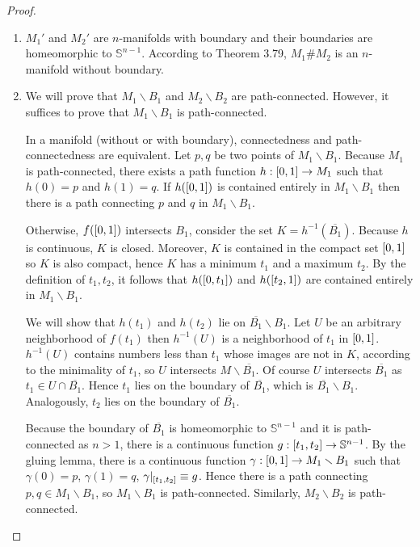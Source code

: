 \begin{proof}
	\begin{enumerate}[label={(\alph*)}]
		\item $M_{1}'$ and $M_{2}'$ are $n$-manifolds with boundary and their boundaries are homeomorphic to $\mathbb{S}^{n-1}$. According to Theorem 3.79, $M_{1} \# M_{2}$ is an $n$-manifold without boundary.
		\item We will prove that $M_{1}\smallsetminus B_{1}$ and $M_{2}\smallsetminus B_{2}$ are path-connected. However, it suffices to prove that $M_{1}\smallsetminus B_{1}$ is path-connected.

		      In a manifold (without or with boundary), connectedness and path-connectedness are equivalent. Let $p, q$ be two points of $M_{1}\smallsetminus B_{1}$. Because $M_{1}$ is path-connected, there exists a path function $h: \left[{0, 1}\right] \to M_{1}$ such that $h(0) = p$ and $h(1) = q$. If $h(\left[{0, 1}\right])$ is contained entirely in $M_{1}\smallsetminus B_{1}$ then there is a path connecting $p$ and $q$ in $M_{1}\smallsetminus B_{1}$.

		      Otherwise, $f(\left[{0, 1}\right])$ intersects $B_{1}$, consider the set $K = h^{-1}(\overline{B_{1}})$. Because $h$ is continuous, $K$ is closed. Moreover, $K$ is contained in the compact set $\left[{0, 1}\right]$ so $K$ is also compact, hence $K$ has a minimum $t_{1}$ and a maximum $t_{2}$. By the definition of $t_{1}, t_{2}$, it follows that $h(\left[{0, t_{1}}\right])$ and $h(\left[{t_{2}, 1}\right])$ are contained entirely in $M_{1}\smallsetminus B_{1}$.

		      We will show that $h(t_{1})$ and $h(t_{2})$ lie on $\overline{B_{1}}\smallsetminus B_{1}$. Let $U$ be an arbitrary neighborhood of $f(t_{1})$ then $h^{-1}(U)$ is a neighborhood of $t_{1}$ in $\left[{0, 1}\right]$. $h^{-1}(U)$ contains numbers less than $t_{1}$ whose images are not in $K$, according to the minimality of $t_{1}$, so $U$ intersects $M\smallsetminus \overline{B_{1}}$. Of course $U$ intersects $\overline{B_{1}}$ as $t_{1} \in U \cap \overline{B_{1}}$. Hence $t_{1}$ lies on the boundary of $\overline{B_{1}}$, which is $\overline{B_{1}}\smallsetminus B_{1}$. Analogously, $t_{2}$ lies on the boundary of $\overline{B_{1}}$.

		      Because the boundary of $\overline{B_{1}}$ is homeomorphic to $\mathbb{S}^{n-1}$ and it is path-connected as $n > 1$, there is a continuous function $g: \left[{t_{1}, t_{2}}\right] \to \mathbb{S}^{n-1}$. By the gluing lemma, there is a continuous function $\gamma: \left[{0, 1}\right] \to M_{1}\smallsetminus B_{1}$ such that $\gamma(0) = p$, $\gamma(1) = q$, $\gamma\vert_{\left[{t_{1}, t_{2}}\right]} \equiv g$. Hence there is a path connecting $p, q\in M_{1}\smallsetminus B_{1}$, so $M_{1}\smallsetminus B_{1}$ is path-connected. Similarly, $M_{2}\smallsetminus B_{2}$ is path-connected.


\end{enumerate}
\end{proof}
